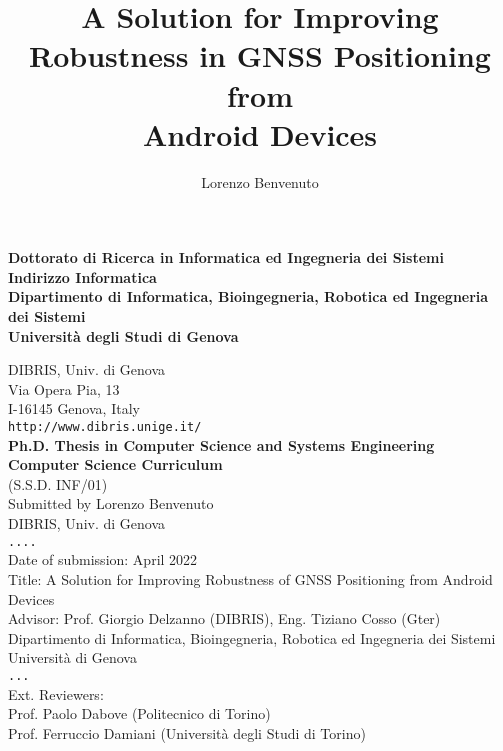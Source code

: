 \documentclass{disithesis}
\begin{document}
	
%

\title{A Solution for Improving\\ Robustness in GNSS Positioning from\\ Android Devices}

\author{Lorenzo Benvenuto}



\maketitle

\begin{addresspage}
{\bf
Dottorato di Ricerca in Informatica ed Ingegneria dei Sistemi\\
Indirizzo Informatica\\
Dipartimento di Informatica, Bioingegneria, Robotica ed Ingegneria dei Sistemi \\
Universit\`a degli Studi di Genova\\[2ex]}

DIBRIS, Univ. di Genova\\
Via Opera Pia, 13\\
I-16145 Genova, Italy\\
{\tt http://www.dibris.unige.it/}\\[2ex]

{\bf
Ph.D. Thesis in Computer Science and Systems Engineering\\
Computer Science Curriculum}\\
(S.S.D. INF/01)\\[2ex]

Submitted by Lorenzo Benvenuto\\
DIBRIS, Univ. di Genova\\
{\tt ....}\\[2ex]

Date of submission:
April 2022\\[2ex]

Title:
A Solution for Improving Robustness of 
GNSS Positioning from Android Devices\\[2ex]

Advisor: Prof. Giorgio Delzanno (DIBRIS), Eng. Tiziano Cosso (Gter)
\\
Dipartimento di Informatica, Bioingegneria, Robotica ed Ingegneria dei Sistemi\\
Universit\`a di Genova\\
{\tt ...}\\[2ex]

Ext. Reviewers:\\
Prof. Paolo Dabove (Politecnico di Torino)\\ Prof. Ferruccio Damiani (Università degli Studi di Torino)
\end{addresspage}
\end{document}
